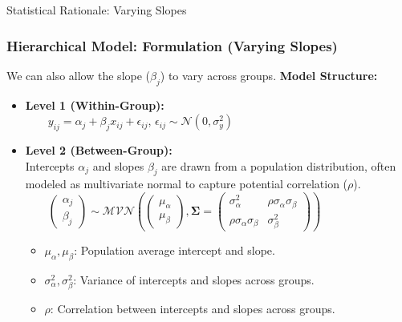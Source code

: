 \documentclass[aspectratio=169]{beamer}
\begin{document}
\begin{frame}[fragile]{Statistical Rationale: Varying Slopes}
    \frametitle{Hierarchical Model: Formulation (Varying Slopes)}
    We can also allow the slope ($\beta_j$) to vary across groups.
    \pause
    \textbf{Model Structure:}
    \begin{itemize}
        \item \textbf{Level 1 (Within-Group):}
        \\[1ex]
          $ \qquad y_{ij} = \alpha_j + \beta_j x_{ij} + \epsilon_{ij} $, \quad $\epsilon_{ij} \sim \mathcal{N}(0, \sigma^2_y)$
        \pause
        \item \textbf{Level 2 (Between-Group):}
        \\[1ex]
          Intercepts $\alpha_j$ and slopes $\beta_j$ are drawn from a population distribution, often modeled as multivariate normal to capture potential correlation ($\rho$).
        \\[2ex]
          $ \qquad \begin{pmatrix} \alpha_j \\ \beta_j \end{pmatrix} \sim \mathcal{MVN} \left( \begin{pmatrix} \mu_{\alpha} \\ \mu_{\beta} \end{pmatrix}, \mathbf{\Sigma} = \begin{pmatrix} \sigma^2_{\alpha} & \rho \sigma_{\alpha} \sigma_{\beta} \\ \rho \sigma_{\alpha} \sigma_{\beta} & \sigma^2_{\beta} \end{pmatrix} \right) $
        \\[2ex]
          \begin{itemize}
            \item $\mu_{\alpha}, \mu_{\beta}$: Population average intercept and slope.
            \item $\sigma^2_{\alpha}, \sigma^2_{\beta}$: Variance of intercepts and slopes across groups.
            \item $\rho$: Correlation between intercepts and slopes across groups.
          \end{itemize}
    \end{itemize}
\end{frame}
\end{document}

